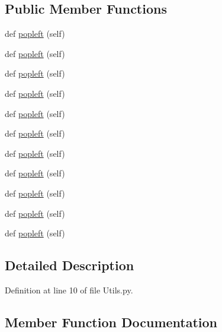 \subsection*{Public Member Functions}
\begin{DoxyCompactItemize}
\item 
def \hyperlink{classwaflib_1_1_utils_1_1deque_a86438c3836eaa61b1bb6bccd439b4129}{popleft} (self)
\item 
def \hyperlink{classwaflib_1_1_utils_1_1deque_a86438c3836eaa61b1bb6bccd439b4129}{popleft} (self)
\item 
def \hyperlink{classwaflib_1_1_utils_1_1deque_a86438c3836eaa61b1bb6bccd439b4129}{popleft} (self)
\item 
def \hyperlink{classwaflib_1_1_utils_1_1deque_a86438c3836eaa61b1bb6bccd439b4129}{popleft} (self)
\item 
def \hyperlink{classwaflib_1_1_utils_1_1deque_a86438c3836eaa61b1bb6bccd439b4129}{popleft} (self)
\item 
def \hyperlink{classwaflib_1_1_utils_1_1deque_a86438c3836eaa61b1bb6bccd439b4129}{popleft} (self)
\item 
def \hyperlink{classwaflib_1_1_utils_1_1deque_a86438c3836eaa61b1bb6bccd439b4129}{popleft} (self)
\item 
def \hyperlink{classwaflib_1_1_utils_1_1deque_a86438c3836eaa61b1bb6bccd439b4129}{popleft} (self)
\item 
def \hyperlink{classwaflib_1_1_utils_1_1deque_a86438c3836eaa61b1bb6bccd439b4129}{popleft} (self)
\item 
def \hyperlink{classwaflib_1_1_utils_1_1deque_a86438c3836eaa61b1bb6bccd439b4129}{popleft} (self)
\item 
def \hyperlink{classwaflib_1_1_utils_1_1deque_a86438c3836eaa61b1bb6bccd439b4129}{popleft} (self)
\end{DoxyCompactItemize}


\subsection{Detailed Description}


Definition at line 10 of file Utils.\+py.



\subsection{Member Function Documentation}
